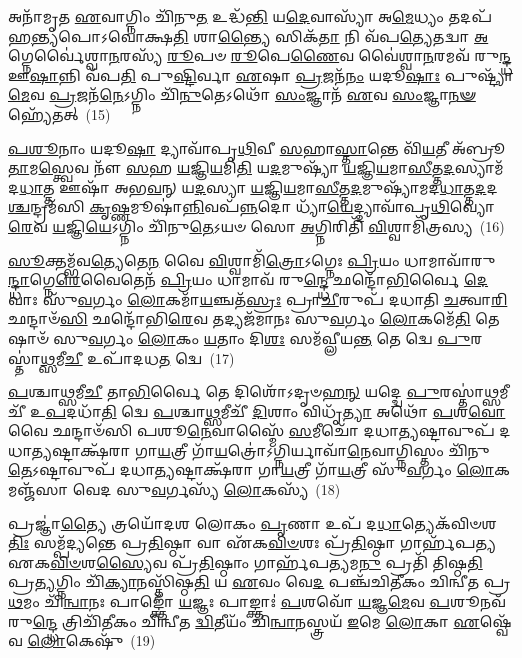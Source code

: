 𑌅𑌨𑌾᳴𑌮𑍃𑌤 \ul{𑌏}\-𑌵𑌾𑌗𑍍𑌨𑌿𑌂 𑌚𑌿᳴𑌨𑍁\-\ul{𑌤} 𑌉𑌦𑍍𑌧᳴\-\ul{𑌨𑍍𑌤𑌿} 𑌯\-\ul{𑌦𑍇}\-𑌵𑌾𑌸𑍍𑌯𑌾᳴ 𑌅\-\ul{𑌮𑍇}\-𑌧𑍍𑌯𑌂 𑌤𑌦𑌪᳴ 𑌹\-\ul{𑌨𑍍𑌤𑍍𑌯}\-𑌪𑍋\-𑌽𑌵𑍋॑𑌕𑍍𑌷\-\ul{𑌤𑌿} 𑌶𑌾\-\ul{𑌨𑍍𑌤𑍍𑌯𑍈} 𑌸𑌿𑌕᳴\-\ul{𑌤𑌾} 𑌨𑌿 𑌵᳴𑌪\-\ul{𑌤𑍍𑌯𑍇}\-𑌤𑌦𑍍𑌵𑌾 \ul{𑌅}\-𑌗𑍍𑌨𑍇𑌰𑍍𑌵𑍈॑𑌶𑍍𑌵𑌾\-\ul{𑌨}\-𑌰𑌸𑍍𑌯᳴ \ul{𑌰𑍂}\-𑌪𑍞 \ul{𑌰𑍂}\-𑌪𑍇\-\ul{𑌣𑍈}\-𑌵 𑌵𑍈॑𑌶𑍍𑌵𑌾\-\ul{𑌨}\-𑌰𑌮𑌵᳴ 𑌰𑍁\-\ul{𑌨𑍍𑌦𑍍𑌧} 𑌊\-\ul{𑌷𑌾}\-𑌨𑍍𑌨𑌿 𑌵᳴𑌪\-\ul{𑌤𑌿} 𑌪𑍁\-\ul{𑌷𑍍𑌟𑌿}\-𑌰𑍍𑌵𑌾 \ul{𑌏}\-𑌷𑌾 \ul{𑌪𑍍𑌰}\-𑌜𑌨᳴\-\ul{𑌨𑌂} 𑌯𑌦𑍂\-\ul{𑌷𑌾𑌃} 𑌪𑍁𑌷𑍍𑌟𑍍𑌯𑌾᳴\-\ul{𑌮𑍇}\-𑌵 \ul{𑌪𑍍𑌰}\-𑌜𑌨᳴\-\ul{𑌨𑍇}\-\-𑌽𑌗𑍍𑌨𑌿𑌂 𑌚𑌿᳴\-\ul{𑌨𑍁}\-𑌤𑍇\-𑌽𑌥𑍋᳴ \ul{𑌸𑌂}\-𑌜𑍍𑌞𑌾𑌨᳴ \ul{𑌏}\-𑌵 \ul{𑌸𑌂}\-𑌜𑍍𑌞𑌾\-\ul{𑌨}\-\-\ul{𑍟} 𑌹𑍍𑌯𑍇᳴𑌤𑌤𑍍~(15)

\-\ul{𑌪}\-\-\ul{𑌶𑍂}\-𑌨𑌾𑌂 𑌯𑌦𑍂\-\ul{𑌷𑌾} 𑌦𑍍𑌯𑌾𑌵𑌾᳴𑌪𑍃\-\ul{𑌥𑌿}\-𑌵𑍀 \ul{𑌸}\-𑌹𑌾\-\ul{𑌸𑍍𑌤𑌾}\-𑌨𑍍𑌤𑍇 𑌵𑌿᳴\-\ul{𑌯}\-𑌤𑍀 𑌅᳴𑌬𑍍𑌰𑍂\-\ul{𑌤𑌾}\-𑌮\-\ul{𑌸𑍍𑌤𑍍𑌵𑍇}\-𑌵 𑌨𑍗᳴ \ul{𑌸}\-𑌹 \ul{𑌯}\-𑌜𑍍𑌞𑌿\-\ul{𑌯}\-𑌮𑌿\-\ul{𑌤𑌿} 𑌯\-\ul{𑌦}\-𑌮𑍁𑌷𑍍𑌯𑌾᳴ \ul{𑌯}\-𑌜𑍍𑌞𑌿\-\ul{𑌯}\-𑌮𑌾\-\ul{𑌸𑍀}\-𑌤𑍍𑌤\-\ul{𑌦}\-𑌸𑍍𑌯𑌾𑌮᳴𑌦\-\ul{𑌧𑌾}\-𑌤𑍍𑌤 𑌊𑌷𑌾᳴ 𑌅𑌭\-\ul{𑌵}\-𑌨𑍍 𑌯\-\ul{𑌦}\-𑌸𑍍𑌯𑌾 \ul{𑌯}\-𑌜𑍍𑌞𑌿\-\ul{𑌯}\-𑌮𑌾\-\ul{𑌸𑍀}\-𑌤𑍍𑌤\-\ul{𑌦}\-𑌮𑍁𑌷𑍍𑌯𑌾᳴𑌮𑌦\-\ul{𑌧𑌾}\-𑌤𑍍𑌤\-\ul{𑌦}\-𑌦\-\ul{𑌶𑍍𑌚}\-𑌨𑍍𑌦𑍍𑌰𑌮᳴𑌸𑌿 \ul{𑌕𑍃}\-𑌷𑍍𑌣𑌮𑍂𑌷𑌾॑\-\ul{𑌨𑍍𑌨𑌿}\-𑌵𑌪᳴\-\ul{𑌨𑍍𑌨}\-𑌦𑍋 𑌧𑍍𑌯𑌾᳴\-\ul{𑌯𑍇}\-𑌦𑍍𑌦𑍍𑌯𑌾𑌵𑌾᳴𑌪𑍃\-\ul{𑌥𑌿}\-𑌵𑍍𑌯𑍋\-\ul{𑌰𑍇}\-𑌵 \ul{𑌯}\-𑌜𑍍𑌞𑌿\-\ul{𑌯𑍇}\-\-𑌽𑌗𑍍𑌨𑌿𑌂 𑌚𑌿᳴𑌨𑍁\-\ul{𑌤𑍇}\-\-𑌽𑌯𑍞 𑌸𑍋 \ul{𑌅}\-𑌗𑍍𑌨𑌿𑌰𑌿𑌤𑌿᳴ \ul{𑌵𑌿}\-𑌶𑍍𑌵𑌾𑌮𑌿᳴𑌤𑍍𑌰𑌸𑍍𑌯~(16)

\-\ul{𑌸𑍂}\-𑌕𑍍𑌤𑌮𑍍𑌭᳴𑌵\-\ul{𑌤𑍍𑌯𑍇}\-𑌤𑍇\-\ul{𑌨} 𑌵𑍈 \ul{𑌵𑌿}\-𑌶𑍍𑌵𑌾𑌮𑌿᳴\-\ul{𑌤𑍍𑌰𑍋}\-\-𑌽𑌗𑍍𑌨𑍇𑌃 \ul{𑌪𑍍𑌰𑌿}\-𑌯𑌂 𑌧𑌾𑌮𑌾𑌵𑌾᳴𑌰𑍁\-\ul{𑌨𑍍𑌦𑍍𑌧𑌾}\-𑌗𑍍𑌨𑍇\-\ul{𑌰𑍇}\-𑌵𑍈𑌤𑍇𑌨᳴ \ul{𑌪𑍍𑌰𑌿}\-𑌯𑌂 𑌧𑌾𑌮𑌾𑌵᳴ 𑌰𑍁\-\ul{𑌨𑍍𑌦𑍍𑌧𑍇} 𑌛𑌨𑍍𑌦𑍋᳴\-\ul{𑌭𑌿}\-𑌰𑍍𑌵𑍈 \ul{𑌦𑍇}\-𑌵𑌾𑌃 𑌸𑍁᳴\-\ul{𑌵}\-𑌰𑍍𑌗𑌂 \ul{𑌲𑍋}\-𑌕𑌮𑌾᳴\-\ul{𑌯}\-𑌞𑍍𑌚𑌤᳴\-\ul{𑌸𑍍𑌰𑌃} 𑌪𑍍𑌰𑌾\-\ul{𑌚𑍀}\-𑌰𑍁𑌪᳴ 𑌦𑌧𑌾𑌤𑌿 \ul{𑌚}\-𑌤𑍍𑌵𑌾\-\ul{𑌰𑌿} 𑌛𑌨𑍍𑌦𑌾𑍞᳴\-\ul{𑌸𑌿} 𑌛𑌨𑍍𑌦𑍋᳴𑌭𑌿\-\ul{𑌰𑍇}\-𑌵 𑌤𑌦𑍍𑌯𑌜᳴𑌮𑌾𑌨𑌃 𑌸𑍁\-\ul{𑌵}\-𑌰𑍍𑌗𑌂 \ul{𑌲𑍋}\-𑌕𑌮𑍇᳴\-\ul{𑌤𑌿} 𑌤𑍇𑌷𑌾𑍞᳴ 𑌸𑍁\-\ul{𑌵}\-𑌰𑍍𑌗𑌂 \ul{𑌲𑍋}\-𑌕𑌂 \ul{𑌯}\-𑌤𑌾𑌂 𑌦𑌿\-\ul{𑌶𑌃} 𑌸𑌮᳴𑌵𑍍𑌲𑍀𑌯\-\ul{𑌨𑍍𑌤} 𑌤𑍇 𑌦𑍍𑌵𑍇 \ul{𑌪𑍁}\-𑌰𑌸𑍍𑌤𑌾॑\-\ul{𑌥𑍍𑌸}\-𑌮𑍀\-\ul{𑌚𑍀} 𑌉𑌪𑌾᳴𑌦𑌧\-\ul{𑌤} 𑌦𑍍𑌵𑍇~(17)

\-\ul{𑌪}\-𑌶𑍍𑌚𑌾\-\ul{𑌥𑍍𑌸}\-𑌮𑍀\-\ul{𑌚𑍀} 𑌤𑌾\-\ul{𑌭𑌿}\-𑌰𑍍𑌵𑍈 𑌤𑍇 𑌦𑌿𑌶𑍋᳴\-𑌽𑌦𑍃𑍞\-\ul{𑌹}\-\-\ul{𑌨𑍍} 𑌯𑌦𑍍𑌦𑍍𑌵𑍇 \ul{𑌪𑍁}\-𑌰𑌸𑍍𑌤𑌾॑\-\ul{𑌥𑍍𑌸}\-𑌮𑍀𑌚𑍀᳴ 𑌉\-\ul{𑌪}\-𑌦𑌧𑌾᳴\-\ul{𑌤𑌿} 𑌦𑍍𑌵𑍇 \ul{𑌪}\-𑌶𑍍𑌚𑌾\-\ul{𑌥𑍍𑌸}\-𑌮𑍀𑌚𑍀᳴ \ul{𑌦𑌿}\-𑌶𑌾𑌂 𑌵𑌿𑌧𑍃᳴\-\ul{𑌤𑍍𑌯𑌾} 𑌅𑌥𑍋᳴ \ul{𑌪}\-𑌶\-\ul{𑌵𑍋} 𑌵𑍈 𑌛𑌨𑍍𑌦𑌾𑍞᳴𑌸𑌿 𑌪𑌶𑍂\-\ul{𑌨𑍇}\-𑌵𑌾𑌸𑍍𑌮𑍈᳴ \ul{𑌸}\-𑌮𑍀𑌚𑍋᳴ 𑌦𑌧𑌾\-\ul{𑌤𑍍𑌯}\-𑌷𑍍𑌟𑌾𑌵𑍁𑌪᳴ 𑌦𑌧𑌾\-\ul{𑌤𑍍𑌯}\-𑌷𑍍𑌟𑌾𑌕𑍍𑌷᳴𑌰𑌾 𑌗𑌾\-\ul{𑌯}\-𑌤𑍍𑌰𑍀 𑌗𑌾᳴\-\ul{𑌯}\-𑌤𑍍𑌰𑍋॑\-𑌽𑌗𑍍𑌨𑌿𑌰𑍍𑌯𑌾𑌵𑌾᳴\-\ul{𑌨𑍇}\-𑌵𑌾𑌗𑍍𑌨𑌿𑌸𑍍𑌤𑌂 𑌚𑌿᳴𑌨𑍁\-\ul{𑌤𑍇}\-\-𑌽𑌷𑍍𑌟𑌾𑌵𑍁𑌪᳴ 𑌦𑌧𑌾\-\ul{𑌤𑍍𑌯}\-𑌷𑍍𑌟𑌾𑌕𑍍𑌷᳴𑌰𑌾 𑌗𑌾\-\ul{𑌯}\-𑌤𑍍𑌰𑍀 𑌗𑌾᳴\-\ul{𑌯}\-𑌤𑍍𑌰𑍀 𑌸𑍁᳴\-\ul{𑌵}\-𑌰𑍍𑌗𑌂 \ul{𑌲𑍋}\-𑌕𑌮𑌞𑍍𑌜᳴𑌸𑌾 𑌵𑍇𑌦 𑌸𑍁\-\ul{𑌵}\-𑌰𑍍𑌗𑌸𑍍𑌯᳴ \ul{𑌲𑍋}\-𑌕𑌸𑍍𑌯᳴~(18)

𑌪𑍍𑌰𑌜𑍍𑌞𑌾॑\-\ul{𑌤𑍍𑌯𑍈} 𑌤𑍍𑌰𑌯𑍋᳴𑌦𑌶 𑌲𑍋𑌕𑌂 \ul{𑌪𑍃}\-𑌣𑌾 𑌉𑌪᳴ 𑌦\-\ul{𑌧𑌾}\-𑌤𑍍𑌯𑍇𑌕᳴𑌵𑌿𑍞𑌶\-\ul{𑌤𑌿𑌃} 𑌸𑌮𑍍𑌪᳴𑌦𑍍𑌯𑌨𑍍𑌤𑍇 𑌪𑍍𑌰\-\ul{𑌤𑌿}\-𑌷𑍍𑌠𑌾 𑌵𑌾 𑌏᳴𑌕\-\ul{𑌵𑌿}\-\-\ul{𑍞}\-𑌶𑌃 𑌪𑍍𑌰᳴\-\ul{𑌤𑌿}\-𑌷𑍍𑌠𑌾 𑌗𑌾𑌰𑍍\mbox{}𑌹᳴𑌪𑌤𑍍𑌯 𑌏𑌕\-\ul{𑌵𑌿}\-\-\ul{𑍞}\-𑌶\-\ul{𑌸𑍍𑌯𑍈}\-𑌵 𑌪𑍍𑌰᳴\-\ul{𑌤𑌿}\-𑌷𑍍𑌠𑌾𑌂 𑌗𑌾𑌰𑍍\mbox{}𑌹᳴𑌪\-\ul{𑌤𑍍𑌯}\-𑌮\-\ul{𑌨𑍁} 𑌪𑍍𑌰𑌤𑌿᳴ 𑌤𑌿𑌷𑍍𑌠\-\ul{𑌤𑌿} 𑌪𑍍𑌰\-\ul{𑌤𑍍𑌯}\-𑌗𑍍𑌨𑌿𑌂 𑌚𑌿᳴\-\ul{𑌕𑍍𑌯𑌾}\-𑌨𑌸𑍍𑌤𑌿᳴𑌷𑍍𑌠\-\ul{𑌤𑌿} 𑌯 \ul{𑌏}\-𑌵𑌂 𑌵𑍇\-\ul{𑌦} 𑌪𑌞𑍍𑌚᳴𑌚𑌿𑌤𑍀𑌕𑌂 𑌚𑌿𑌨𑍍𑌵𑍀𑌤 𑌪𑍍𑌰\-\ul{𑌥}\-𑌮𑌂 𑌚𑌿᳴\-\ul{𑌨𑍍𑌵𑌾}\-𑌨𑌃 𑌪𑌾𑌙𑍍𑌕𑍍𑌤𑍋᳴ \ul{𑌯}\-𑌜𑍍𑌞𑌃 𑌪𑌾𑌙𑍍𑌕𑍍𑌤𑌾𑌃॑ \ul{𑌪}\-𑌶𑌵𑍋᳴ \ul{𑌯}\-𑌜𑍍𑌞\-\ul{𑌮𑍇}\-𑌵 \ul{𑌪}\-𑌶𑍂𑌨𑌵᳴ 𑌰𑍁\-\ul{𑌨𑍍𑌦𑍍𑌧𑍇} 𑌤𑍍𑌰𑌿𑌚𑌿᳴𑌤𑍀𑌕𑌂 𑌚𑌿𑌨𑍍𑌵𑍀𑌤 \ul{𑌦𑍍𑌵𑌿}\-𑌤𑍀𑌯𑌂᳴ 𑌚𑌿\-\ul{𑌨𑍍𑌵𑌾}\-𑌨𑌸𑍍𑌤𑍍𑌰𑌯᳴ \ul{𑌇}\-𑌮𑍇 \ul{𑌲𑍋}\-𑌕𑌾 \ul{𑌏}\-𑌷𑍍𑌵𑍇᳴𑌵 \ul{𑌲𑍋}\-𑌕𑍇𑌷𑍁᳴~(19)


